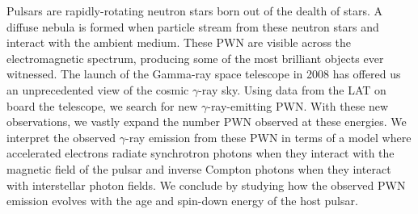 
Pulsars are rapidly-rotating neutron stars born out of the dealth
of stars.  A diffuse nebula is formed when particle stream from these
neutron stars and interact with the ambient medium. These \ac{PWN}
are visible across the electromagnetic spectrum,  producing some of
the most brilliant objects ever witnessed.  The launch of the \fermi
Gamma-ray space telescope in 2008 has offered us an unprecedented view
of the cosmic $\gamma$-ray sky.  Using data from the \acrlong{LAT} on board
the \fermi telescope, we search for new $\gamma$-ray-emitting \ac{PWN}.
With these new observations, we vastly expand the number \ac{PWN} observed
at these energies. We interpret the observed $\gamma$-ray emission from
these \ac{PWN} in terms of a model where accelerated electrons radiate
synchrotron photons when they interact with the magnetic field of the
pulsar and inverse Compton photons when they interact with interstellar
photon fields.  We conclude by studying how the observed \ac{PWN}
emission evolves with the age and spin-down energy of the host pulsar.
